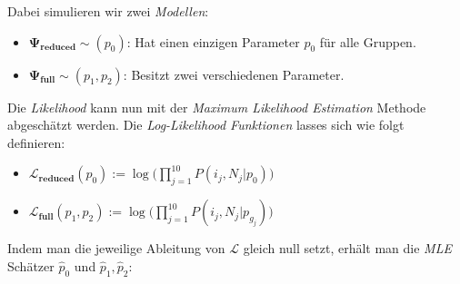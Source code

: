 \documentclass[12pt]{article}
\begin{document}
Dabei simulieren wir zwei \textit{Modellen}:
\begin{itemize}
    \item $\mathbf{\Psi_{reduced}} \sim(p_{0})$: Hat einen einzigen Parameter $p_{0}$ für alle Gruppen.
    \item $\mathbf{\Psi_{full}} \sim(p_{1}, p_{2})$: Besitzt zwei verschiedenen Parameter.
\end{itemize}
Die \textit{Likelihood} kann nun mit der \textit{Maximum Likelihood Estimation} Methode
abgeschätzt werden.
Die \textit{Log-Likelihood Funktionen} lasses sich wie folgt definieren:
\begin{itemize}
\item $\mathbf{\mathcal{L}_{reduced}}(p_{0}) := \log\Big(\prod_{j = 1}^{10}P(i_{j},N_{j}|p_{0})\Big)$
\item $\mathbf{\mathcal{L}_{full}}(p_{1}, p_{2}) := \log\Big(\prod_{j = 1}^{10}P(i_{j},N_{j}|p_{g_{j}})\Big)$
\end{itemize}
Indem man die jeweilige Ableitung von $\mathbf{\mathcal{L}}$ gleich null setzt, 
erhält man die \textit{MLE} Schätzer $\hat p_{0}$ und $\hat p_{1}, \hat p_{2}$:
\end{document}
